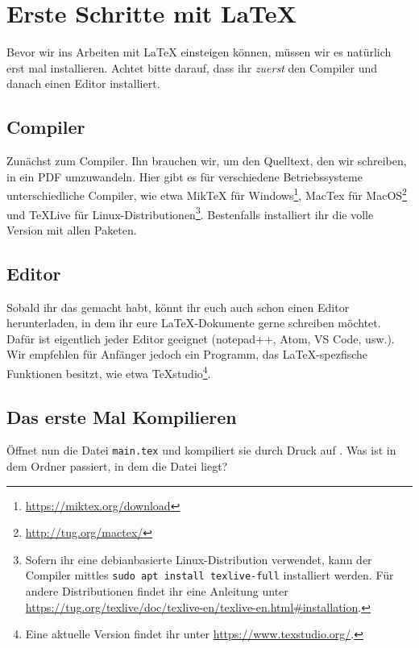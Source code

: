 \chapter*{Erste Schritte mit \LaTeX}
Bevor wir ins Arbeiten mit \LaTeX{} einsteigen können, müssen wir es natürlich erst mal installieren. Achtet bitte darauf, dass ihr \emph{zuerst} den Compiler und danach einen Editor installiert.

\section*{Compiler}
Zunächst zum Compiler. Ihn brauchen wir, um den Quelltext, den wir schreiben, in ein PDF umzuwandeln. Hier gibt es für verschiedene Betriebssysteme unterschiedliche Compiler, wie etwa MikTeX für Windows\footnote{\url{https://miktex.org/download}}, MacTex für MacOS\footnote{\url{http://tug.org/mactex/}} und TeXLive für Linux-Distributionen\footnote{Sofern ihr eine debianbasierte Linux-Distribution verwendet, kann der Compiler mittles \texttt{sudo apt install texlive-full} installiert werden. Für andere Distributionen findet ihr eine Anleitung unter \url{https://tug.org/texlive/doc/texlive-en/texlive-en.html\#installation}.}. Bestenfalls installiert ihr die volle Version mit allen Paketen.

\section*{Editor}
Sobald ihr das gemacht habt, könnt ihr euch auch schon einen Editor herunterladen, in dem ihr eure \LaTeX-Dokumente gerne schreiben möchtet. Dafür ist eigentlich jeder Editor geeignet (notepad++, Atom, VS Code, usw.). Wir empfehlen für Anfänger jedoch ein Programm, das \LaTeX-spezfische Funktionen besitzt, wie etwa TeXstudio\footnote{Eine aktuelle Version findet ihr unter \url{https://www.texstudio.org/}.}.

\section*{Das erste Mal Kompilieren}
Öffnet nun die Datei \texttt{main.tex} und kompiliert sie durch Druck auf \faForward. Was ist in dem Ordner passiert, in dem die Datei liegt?
